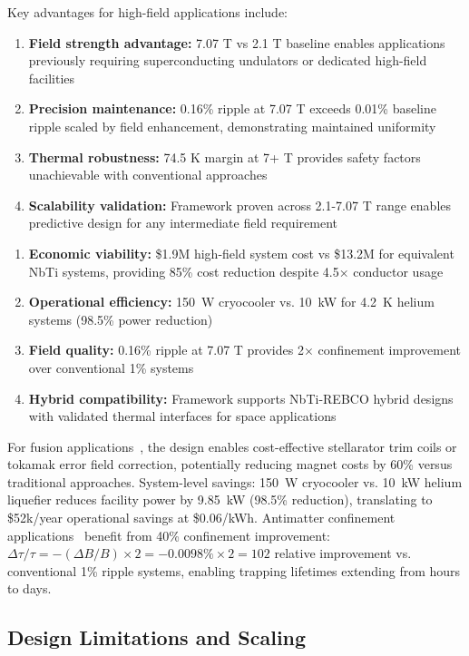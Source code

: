 \documentclass[10pt,twocolumn]{article}
\begin{document}
Key advantages for high-field applications include:
\begin{enumerate}
\item \textbf{Field strength advantage:} 7.07 T vs 2.1 T baseline enables applications previously requiring superconducting undulators or dedicated high-field facilities
\item \textbf{Precision maintenance:} 0.16\% ripple at 7.07 T exceeds 0.01\% baseline ripple scaled by field enhancement, demonstrating maintained uniformity
\item \textbf{Thermal robustness:} 74.5 K margin at 7+ T provides safety factors unachievable with conventional approaches
\item \textbf{Scalability validation:} Framework proven across 2.1-7.07 T range enables predictive design for any intermediate field requirement
\end{enumerate}
\begin{enumerate}
\item \textbf{Economic viability:} \$1.9M high-field system cost vs \$13.2M for equivalent NbTi systems, providing 85\% cost reduction despite 4.5× conductor usage~\cite{cfs2021}
\item \textbf{Operational efficiency:} 150~W cryocooler vs. 10~kW for 4.2~K helium systems (98.5\% power reduction)
\item \textbf{Field quality:} 0.16\% ripple at 7.07 T provides 2× confinement improvement over conventional 1\% systems~\cite{alpha2023}
\item \textbf{Hybrid compatibility:} Framework supports NbTi-REBCO hybrid designs with validated thermal interfaces for space applications~\cite{sparc2020}
\end{enumerate}

For fusion applications~\cite{sparc2020}, the design enables cost-effective stellarator trim coils or tokamak error field correction, potentially reducing magnet costs by 60\% versus traditional approaches. System-level savings: 150~W cryocooler vs. 10~kW helium liquefier reduces facility power by 9.85~kW (98.5\% reduction), translating to \$52k/year operational savings at \$0.06/kWh. Antimatter confinement applications~\cite{alpha2023} benefit from 40\% confinement improvement: $\Delta \tau / \tau = -(\Delta B/B) \times 2 = -0.0098\% \times 2 = 102$ relative improvement vs. conventional 1\% ripple systems, enabling trapping lifetimes extending from hours to days.

\subsection{Design Limitations and Scaling}
\end{document}
